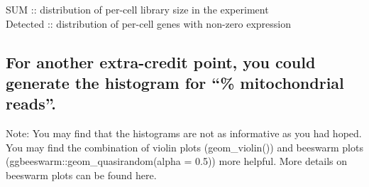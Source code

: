 \documentclass[]{article}
\newenvironment{Shaded}{\begin{snugshade}}{\end{snugshade}}
\newcommand{\KeywordTok}[1]{\textcolor[rgb]{0.13,0.29,0.53}{\textbf{#1}}}
\newcommand{\DataTypeTok}[1]{\textcolor[rgb]{0.13,0.29,0.53}{#1}}
\newcommand{\DecValTok}[1]{\textcolor[rgb]{0.00,0.00,0.81}{#1}}
\newcommand{\StringTok}[1]{\textcolor[rgb]{0.31,0.60,0.02}{#1}}
\newcommand{\OperatorTok}[1]{\textcolor[rgb]{0.81,0.36,0.00}{\textbf{#1}}}
\newcommand{\NormalTok}[1]{#1}
\begin{document}
SUM :: distribution of per-cell library size in the experiment\\
Detected :: distribution of per-cell genes with non-zero expression

\subsection{\texorpdfstring{For another extra-credit point, you could
generate the histogram for ``\% mitochondrial
reads''.}{For another extra-credit point, you could generate the histogram for \% mitochondrial reads.}}\label{for-another-extra-credit-point-you-could-generate-the-histogram-for-mitochondrial-reads.}

Note: You may find that the histograms are not as informative as you had
hoped. You may find the combination of violin plots (geom\_violin()) and
beeswarm plots (ggbeeswarm::geom\_quasirandom(alpha = 0.5)) more
helpful. More details on beeswarm plots can be found here.

\begin{Shaded}
\end{Shaded}
\end{document}
